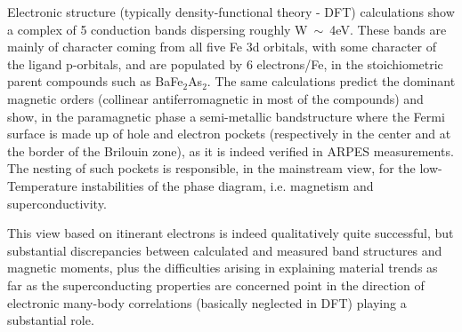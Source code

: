 \documentclass[12pt,twoside]{article}
\begin{document}
Electronic structure (typically density-functional theory - DFT) calculations show a complex of 5 conduction bands dispersing roughly W~$\sim$~4eV. These bands are mainly of character coming from all five Fe 3d orbitals, with some character of the ligand p-orbitals, and are populated by 6 electrons/Fe, in the stoichiometric parent compounds such as BaFe$_2$As$_2$. 
The same calculations predict the dominant magnetic orders (collinear antiferromagnetic in most of the compounds) and show, in the paramagnetic phase a semi-metallic bandstructure where the Fermi surface is made up of hole and electron pockets (respectively in the center and at the border of the Brilouin zone), as it is indeed verified in ARPES measurements. 
The nesting of such pockets is responsible, in the mainstream view, for the low-Temperature instabilities of the phase diagram, i.e. magnetism and superconductivity\cite{PaglioneGreene_NatRev}. 

This view based on itinerant electrons is indeed qualitatively quite successful, but substantial discrepancies between calculated and measured band structures and magnetic moments, plus the difficulties arising in explaining material trends as far as the superconducting properties are concerned point in the direction of electronic many-body correlations (basically neglected in DFT) playing a substantial role.
\end{document}

